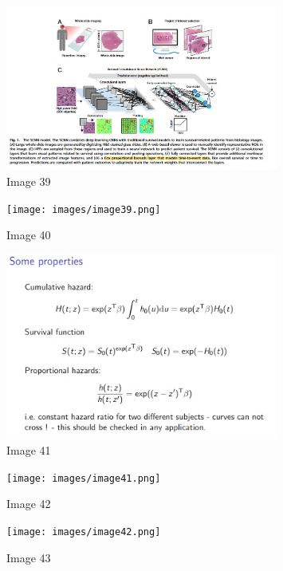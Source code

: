 \documentclass{article}%
\begin{document}
%


\begin{figure}[h!]%
\centering%
\includegraphics[width=0.8\textwidth]{images/image38.png}%
\caption{Image 39}%
\end{figure}

%


\begin{figure}[h!]%
\centering%
\texttt{[image: images/image39.png]}%
\caption{Image 40}%
\end{figure}

%


\begin{figure}[h!]%
\centering%
\includegraphics[width=0.8\textwidth]{images/image40.png}%
\caption{Image 41}%
\end{figure}

%


\begin{figure}[h!]%
\centering%
\texttt{[image: images/image41.png]}%
\caption{Image 42}%
\end{figure}

%


\begin{figure}[h!]%
\centering%
\texttt{[image: images/image42.png]}%
\caption{Image 43}%
\end{figure}
\end{document}
